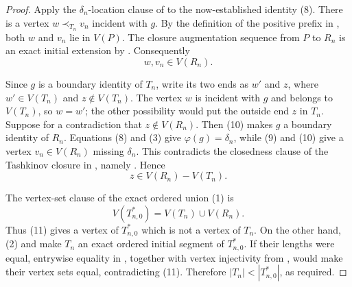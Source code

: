 \begin{proof}
Apply the $\delta_n$-location clause of
 to the now-established identity
(8).  There is a vertex $w\prec_{T_n}v_n$ incident with $g$.  By the
definition of the positive prefix in , both
$w$ and $v_n$ lie in $V(P)$.  The closure augmentation sequence from
$P$ to $R_n$ is an exact initial extension by
.  Consequently
\[
                              w,v_n\in V(R_n).                   \tag{10}
\]

Since $g$ is a boundary identity of $T_n$, write its two ends as
$w'$ and $z$, where $w'\in V(T_n)$ and $z\notin V(T_n)$.  The vertex
$w$ is incident with $g$ and belongs to $V(T_n)$, so $w=w'$; the other
possibility would put the outside end $z$ in $T_n$.  Suppose for a
contradiction that $z\notin V(R_n)$.  Then (10) makes $g$ a boundary
identity of $R_n$.  Equations (8) and (3) give $\varphi(g)=\delta_n$,
while (9) and (10) give a vertex $v_n\in V(R_n)$ missing
$\delta_n$.  This contradicts the closedness clause of the Tashkinov
closure in , namely
.  Hence
\[
                        z\in V(R_n)-V(T_n).                      \tag{11}
\]

The vertex-set clause of the exact ordered union (1) is
\[
 V(T_{n,0}^{*})=V(T_n)\cup V(R_n).
\]
Thus (11) gives a vertex of $T_{n,0}^{*}$ which is not a vertex of
$T_n$.  On the other hand, (2) and
 make $T_n$ an exact
ordered initial segment of $T_{n,0}^{*}$.  If their lengths were equal,
entrywise equality in , together
with vertex injectivity from , would make their
vertex sets equal, contradicting (11).  Therefore
$|T_n|<|T_{n,0}^{*}|$, as required.
\end{proof}
